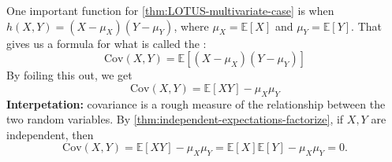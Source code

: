 \documentclass[10pt]{article}
\theoremstyle{definition}
\newcommand{\fl}{\noindent\textbf} %
\newcommand{\1}[1]{\textbf{1}_{\left[#1\right]}} %
\def\E{\mathbb{E}} %
\newcommand{\dempfcolor}[1]{{\color{RoyalBlue}#1}}
\newcommand{\demph}[1]{\dempfcolor{{\sl \textbf{#1}}}}
\begin{document}
One important function for \cref{thm:LOTUS-multivariate-case}  is when $h(X,Y) =
(X-\mu_{X})(Y-\mu_{Y})$, where $\mu_{X}= \E\left[X \right]$ and $\mu_{Y} = \E\left[Y \right]$. That gives
us a formula for what is called the \demph{covariance}:
\begin{equation*}
  \text{Cov}(X,Y) = \E\left[(X-\mu_{X})(Y-\mu_{Y}) \right]
\end{equation*}
By foiling this out, we get
\begin{equation*}
  \text{Cov}(X,Y) = \E\left[XY \right] - \mu_{X}\mu_{Y}
\end{equation*}
\fl{Interpetation:} covariance is a rough measure of the relationship between
the two random variables.
By \cref{thm:independent-expectations-factorize}, if $X,Y$ are independent, then
\begin{equation*}
  \text{Cov}(X,Y) = \E\left[XY \right] - \mu_{X}\mu_{Y} = \E\left[X \right] \E\left[Y \right] -\mu_{X}\mu_{Y} = 0.
\end{equation*}
\end{document}
